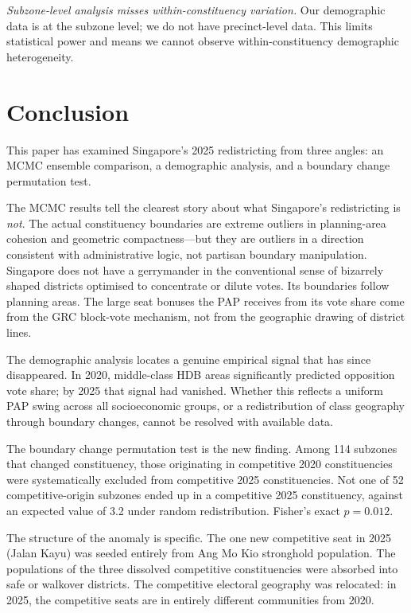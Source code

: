 \documentclass[12pt]{article}
\begin{document}
\textit{Subzone-level analysis misses within-constituency variation.} Our demographic data is at
the subzone level; we do not have precinct-level data. This limits statistical power and means we
cannot observe within-constituency demographic heterogeneity.

\section{Conclusion}

This paper has examined Singapore's 2025 redistricting from three angles: an MCMC ensemble
comparison, a demographic analysis, and a boundary change permutation test.

The MCMC results tell the clearest story about what Singapore's redistricting is \textit{not}. The
actual constituency boundaries are extreme outliers in planning-area cohesion and geometric
compactness---but they are outliers in a direction consistent with administrative logic, not
partisan boundary manipulation. Singapore does not have a gerrymander in the conventional sense of
bizarrely shaped districts optimised to concentrate or dilute votes. Its boundaries follow planning
areas. The large seat bonuses the PAP receives from its vote share come from the GRC block-vote
mechanism, not from the geographic drawing of district lines.

The demographic analysis locates a genuine empirical signal that has since disappeared. In 2020,
middle-class HDB areas significantly predicted opposition vote share; by 2025 that signal had
vanished. Whether this reflects a uniform PAP swing across all socioeconomic groups, or a
redistribution of class geography through boundary changes, cannot be resolved with available data.

The boundary change permutation test is the new finding. Among 114 subzones that changed
constituency, those originating in competitive 2020 constituencies were systematically excluded
from competitive 2025 constituencies. Not one of 52 competitive-origin subzones ended up in a
competitive 2025 constituency, against an expected value of 3.2 under random redistribution.
Fisher's exact $p = 0.012$.

The structure of the anomaly is specific. The one new competitive seat in 2025 (Jalan Kayu) was
seeded entirely from Ang Mo Kio stronghold population. The populations of the three dissolved
competitive constituencies were absorbed into safe or walkover districts. The competitive electoral
geography was relocated: in 2025, the competitive seats are in entirely different communities from
2020.
\end{document}
